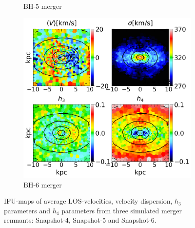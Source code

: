 \documentclass[english, oneside]{HYgradu}
\begin{document}
\begin{figure}
\begin{subfigure}[b]{0.49\textwidth}
		\caption{BH-5 merger}
	\end{subfigure}
	\begin{subfigure}[b]{0.49\textwidth}
		\includegraphics[width=\textwidth]{BH_6.png}
		\caption{BH-6 merger}
	\end{subfigure}
	\caption{IFU-maps of average LOS-velocities, velocity dispersion, $h_3$ parameters and $h_4$ parameters from three simulated merger remnants: Snapshot-4, Snapshot-5 and Snapshot-6.}
	\label{figure:all_voronoi_2}
\end{figure}



\newcommand{\apj}{The Astrophysical Journal}
\newcommand{\mnras}{Monthly Notices of the Royal Astronomical Society}
\newcommand{\apjs}{The Astrophysical Journal Supplement}
\newcommand{\nat}{Nature}
\newcommand{\aj}{The Astronomical Journal}
\newcommand{\na}{New Astronomy}
\newcommand{\araa}{Annual Review of Astronomy and Astrophysics}

\clearpage
{} %


\end{document}
